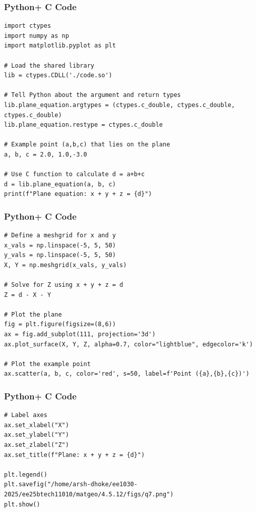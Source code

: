 \documentclass{beamer}
\begin{document}
\begin{frame}[fragile]
    \frametitle{Python+ C Code}
\begin{lstlisting}
import ctypes
import numpy as np
import matplotlib.pyplot as plt

# Load the shared library
lib = ctypes.CDLL('./code.so')

# Tell Python about the argument and return types
lib.plane_equation.argtypes = (ctypes.c_double, ctypes.c_double, ctypes.c_double)
lib.plane_equation.restype = ctypes.c_double

# Example point (a,b,c) that lies on the plane
a, b, c = 2.0, 1.0,-3.0

# Use C function to calculate d = a+b+c
d = lib.plane_equation(a, b, c)
print(f"Plane equation: x + y + z = {d}")
\end{lstlisting}
\end{frame}

\begin{frame}[fragile]
    \frametitle{Python+ C Code}
\begin{lstlisting}
# Define a meshgrid for x and y
x_vals = np.linspace(-5, 5, 50)
y_vals = np.linspace(-5, 5, 50)
X, Y = np.meshgrid(x_vals, y_vals)

# Solve for Z using x + y + z = d
Z = d - X - Y

# Plot the plane
fig = plt.figure(figsize=(8,6))
ax = fig.add_subplot(111, projection='3d')
ax.plot_surface(X, Y, Z, alpha=0.7, color="lightblue", edgecolor='k')

# Plot the example point
ax.scatter(a, b, c, color='red', s=50, label=f'Point ({a},{b},{c})')
\end{lstlisting}
\end{frame}

\begin{frame}[fragile]
    \frametitle{Python+ C Code}
\begin{lstlisting}
# Label axes
ax.set_xlabel("X")
ax.set_ylabel("Y")
ax.set_zlabel("Z")
ax.set_title(f"Plane: x + y + z = {d}")

plt.legend()
plt.savefig("/home/arsh-dhoke/ee1030-2025/ee25btech11010/matgeo/4.5.12/figs/q7.png")
plt.show()

\end{lstlisting}
\end{frame}
\end{document}
